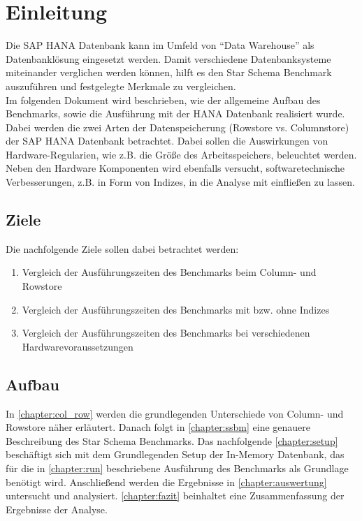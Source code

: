 \chapter{Einleitung}\label{chapter:introduction}

Die SAP HANA Datenbank kann im Umfeld von \enquote{Data Warehouse} als Datenbanklösung eingesetzt werden. Damit verschiedene Datenbanksysteme miteinander verglichen werden können, hilft es den Star Schema Benchmark auszuführen und festgelegte Merkmale zu vergleichen.\\Im folgenden Dokument wird beschrieben, wie der allgemeine Aufbau des Benchmarks, sowie die Ausführung mit der HANA Datenbank realisiert wurde. Dabei werden die zwei Arten der Datenspeicherung (Rowstore vs. Columnstore) der SAP HANA Datenbank betrachtet. Dabei sollen die Auswirkungen von Hardware-Regularien, wie z.B. die Größe des Arbeitsspeichers, beleuchtet werden. Neben den Hardware Komponenten wird ebenfalls versucht, softwaretechnische Verbesserungen, z.B. in Form von Indizes, in die Analyse mit einfließen zu lassen.

\section{Ziele}
Die nachfolgende Ziele sollen dabei betrachtet werden:
\begin{enumerate}
	\item Vergleich der Ausführungszeiten des Benchmarks beim Column- und Rowstore
	\item Vergleich der Ausführungszeiten des Benchmarks mit bzw. ohne Indizes
	\item Vergleich der Ausführungszeiten des Benchmarks bei verschiedenen Hardwarevoraussetzungen
\end{enumerate}

\section{Aufbau}
In \autoref{chapter:col_row} werden die grundlegenden Unterschiede von Column- 
und Rowstore näher erläutert. Danach folgt in \autoref{chapter:ssbm} eine genauere Beschreibung 
des Star Schema Benchmarks. Das nachfolgende \autoref{chapter:setup} beschäftigt sich mit 
dem Grundlegenden Setup der In-Memory Datenbank, das für die in \autoref{chapter:run} 
beschriebene Ausführung des Benchmarks als Grundlage benötigt wird. Anschließend werden die Ergebnisse
in \autoref{chapter:auswertung} untersucht und analysiert. \autoref{chapter:fazit} beinhaltet eine Zusammenfassung der
Ergebnisse der Analyse.


